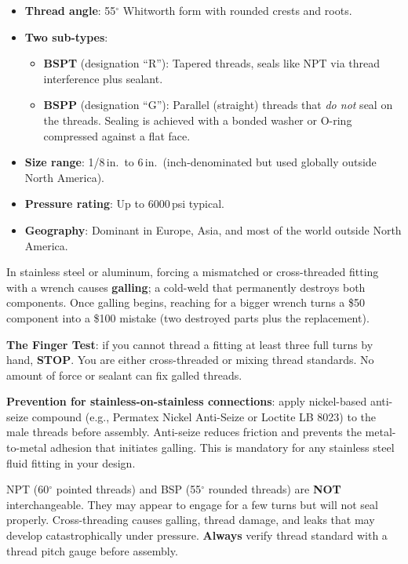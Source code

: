 \documentclass[11pt,letterpaper,twoside,openany]{book}
\providecommand{\ang}[1]{#1\ensuremath{{}^{\circ}}}
\begin{document}
\begin{itemize}[leftmargin=1.5em]
  \item \textbf{Thread angle}: \ang{55} Whitworth form with rounded crests and roots.
  \item \textbf{Two sub-types}:
  \begin{itemize}[nosep]
    \item \textbf{BSPT} (designation ``R''): Tapered threads, seals like NPT via thread interference plus sealant.
    \item \textbf{BSPP} (designation ``G''): Parallel (straight) threads that \emph{do not} seal on the threads. Sealing is achieved with a bonded washer or O-ring compressed against a flat face.
  \end{itemize}
  \item \textbf{Size range}: 1/8\,in.\ to 6\,in.\ (inch-denominated but used globally outside North America).
  \item \textbf{Pressure rating}: Up to 6000\,psi typical.
  \item \textbf{Geography}: Dominant in Europe, Asia, and most of the world outside North America.
\end{itemize}


\begin{warningbox}
In stainless steel or aluminum, forcing a mismatched or cross-threaded fitting with a wrench causes \textbf{galling}; a cold-weld that permanently destroys both components. Once galling begins, reaching for a bigger wrench turns a \$50 component into a \$100 mistake (two destroyed parts plus the replacement).

\textbf{The Finger Test}: if you cannot thread a fitting at least three full turns by hand, \textbf{STOP}. You are either cross-threaded or mixing thread standards. No amount of force or sealant can fix galled threads.

\textbf{Prevention for stainless-on-stainless connections}: apply nickel-based anti-seize compound (e.g., Permatex Nickel Anti-Seize or Loctite LB 8023) to the male threads before assembly. Anti-seize reduces friction and prevents the metal-to-metal adhesion that initiates galling. This is mandatory for any stainless steel fluid fitting in your design.
\end{warningbox}

\begin{warningbox}
NPT (\ang{60} pointed threads) and BSP (\ang{55} rounded threads) are \textbf{NOT} interchangeable. They may appear to engage for a few turns but will not seal properly. Cross-threading causes galling, thread damage, and leaks that may develop catastrophically under pressure. \textbf{Always} verify thread standard with a thread pitch gauge before assembly.
\end{warningbox}
\end{document}
